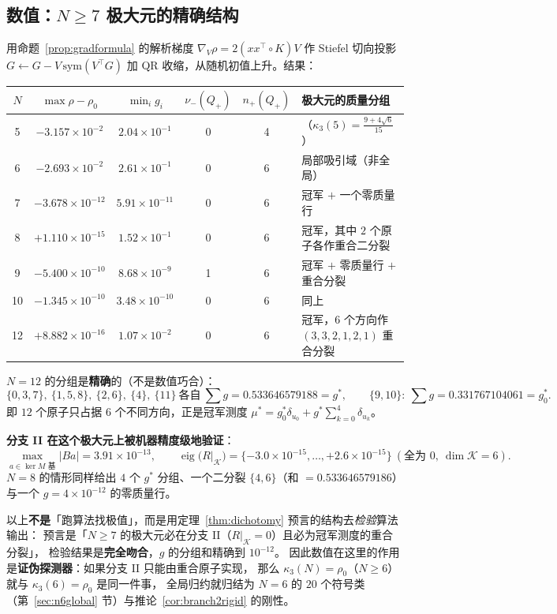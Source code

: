 \subsection{数值：$N\ge7$ 极大元的精确结构}\label{sec:r17:num}

用命题~\ref{prop:gradformula} 的解析梯度 $\nabla_V\rho=2(xx^\top\!\circ K)V$ 作 Stiefel 切向投影
$G\leftarrow G-V\,\mathrm{sym}(V^\top G)$ 加 QR 收缩，从随机初值上升。结果：

\begin{center}\small
\begin{tabular}{cccccl}
\hline
$N$ & $\max\rho-\rho_0$ & $\min_ig_i$ & $\nu_-(Q_+)$ & $n_+(Q_+)$ & 极大元的质量分组 \\
\hline
5 & $-3.157\times10^{-2}$ & $2.04\times10^{-1}$ & 0 & 4 & （$\kappa_3(5)=\frac{9+4\sqrt6}{15}$） \\
6 & $-2.693\times10^{-2}$ & $2.61\times10^{-1}$ & 0 & 6 & 局部吸引域（非全局） \\
7 & $-3.678\times10^{-12}$ & $5.91\times10^{-11}$ & 0 & 6 & 冠军 $+$ 一个零质量行 \\
8 & $+1.110\times10^{-15}$ & $1.52\times10^{-1}$ & 0 & 6 & 冠军，其中 $2$ 个原子各作重合二分裂 \\
9 & $-5.400\times10^{-10}$ & $8.68\times10^{-9}$ & 1 & 6 & 冠军 $+$ 零质量行 $+$ 重合分裂 \\
10 & $-1.345\times10^{-10}$ & $3.48\times10^{-10}$ & 0 & 6 & 同上 \\
12 & $+8.882\times10^{-16}$ & $1.07\times10^{-2}$ & 0 & 6 & 冠军，$6$ 个方向作 $(3,3,2,1,2,1)$ 重合分裂 \\
\hline
\end{tabular}
\end{center}

$N=12$ 的分组是\textbf{精确}的（不是数值巧合）：
\[
\{0,3,7\},\ \{1,5,8\},\ \{2,6\},\ \{4\},\ \{11\}\ \text{各自}\ \textstyle\sum g=0.533646579188=g^\ast,
\qquad \{9,10\}:\ \textstyle\sum g=0.331767104061=g_0^\ast .
\]
即 $12$ 个原子只占据 $6$ 个不同方向，正是冠军测度 $\mu^\ast=g_0^\ast\delta_{u_0}+g^\ast\sum_{k=0}^4\delta_{u_k}$。

\textbf{分支 II 在这个极大元上被机器精度级地验证}：
\[
\max_{a\in\ker M\text{ 基}}|Ba|=3.91\times10^{-13},\qquad
\operatorname{eig}\bigl(R|_{\mathcal K}\bigr)=\{-3.0\times10^{-15},\dots,+2.6\times10^{-15}\}\ (\text{全为 }0,\ \dim\mathcal K=6).
\]
$N=8$ 的情形同样给出 $4$ 个 $g^\ast$ 分组、一个二分裂 $\{4,6\}$（和 $=0.533646579186$）
与一个 $g=4\times10^{-12}$ 的零质量行。

\begin{remark}[数值结论的强度]\label{rmk:numstrength}
以上\textbf{不是}「跑算法找极值」，而是用定理~\ref{thm:dichotomy} 预言的结构去\emph{检验}算法输出：
预言是「$N\ge7$ 的极大元必在分支 II（$R|_{\mathcal K}=0$）且必为冠军测度的重合分裂」，
检验结果是\textbf{完全吻合}，$g$ 的分组和精确到 $10^{-12}$。
因此数值在这里的作用是\textbf{证伪探测器}：如果分支 II 只能由重合原子实现，
那么 $\kappa_3(N)=\rho_0$（$N\ge6$）就与 $\kappa_3(6)=\rho_0$ 是同一件事，
全局归约就归结为 $N=6$ 的 $20$ 个符号类（第~\ref{sec:n6global} 节）与推论~\ref{cor:branch2rigid} 的刚性。
\end{remark}

